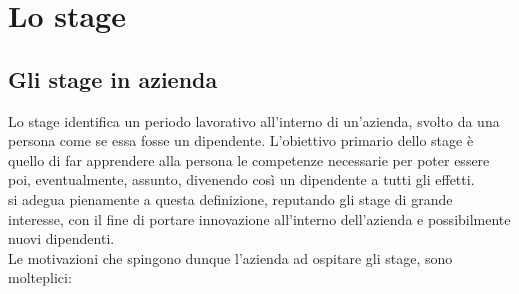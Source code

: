 

\chapter{Lo stage}
\label{cap:stage}

\section{Gli stage in azienda}

Lo stage identifica un periodo lavorativo all'interno di un'azienda, svolto da una persona come se essa fosse un dipendente. L'obiettivo primario dello stage è quello di far apprendere alla persona le competenze necessarie per poter essere poi, eventualmente, assunto, divenendo così un dipendente a tutti gli effetti. \\
\nomeAzienda si adegua pienamente a questa definizione, reputando gli stage di grande interesse, con il fine di portare innovazione all'interno dell'azienda e possibilmente nuovi dipendenti. \\
Le motivazioni che spingono dunque l'azienda ad ospitare gli stage, sono molteplici:

